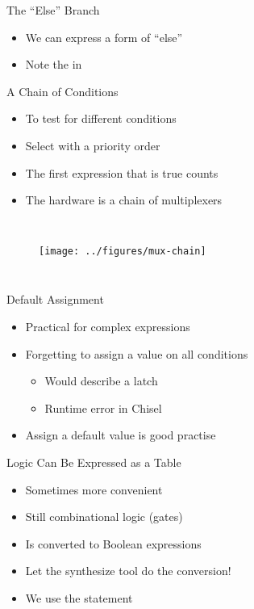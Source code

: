 \begin{frame}[fragile]{The ``Else'' Branch}
\begin{itemize}
\item We can express a form of ``else''
\item Note the  in 
\end{itemize}
\end{frame}



\begin{frame}[fragile]{A Chain of Conditions}
\begin{itemize}
\item To test for different conditions
\item Select with a priority order
\item The first expression that is true counts
\item The hardware is a chain of multiplexers
\end{itemize}
\begin{columns}
\begin{figure}
  \texttt{[image: ../figures/mux-chain]}
\end{figure}
\end{columns}
\end{frame}

\begin{frame}[fragile]{Default Assignment}
\begin{itemize}
\item Practical for complex expressions
\item Forgetting to assign a value on all conditions
\begin{itemize}
\item Would describe a latch
\item Runtime error in Chisel
\end{itemize}
\item Assign a default value is good practise
\end{itemize}
\end{frame}

\begin{frame}[fragile]{Logic Can Be Expressed as a Table}
\begin{itemize}
\item Sometimes more convenient 
\item Still combinational logic (gates)
\item Is converted to Boolean expressions
\item Let the synthesize tool do the conversion!
\item We use the  statement
\end{itemize}
\end{frame}


